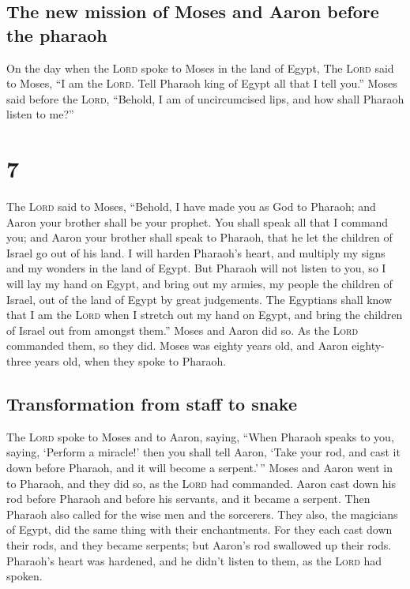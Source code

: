 \hypertarget{the-new-mission-of-moses-and-aaron-before-the-pharaoh}{%
\subsection{The new mission of Moses and Aaron before the
pharaoh}\label{the-new-mission-of-moses-and-aaron-before-the-pharaoh}}

 On the day when the \textsc{Lord} spoke to Moses in the
land of Egypt,  The \textsc{Lord} said to Moses, ``I am
the \textsc{Lord}. Tell Pharaoh king of Egypt all that I tell you.''
 Moses said before the \textsc{Lord}, ``Behold, I am of
uncircumcised lips, and how shall Pharaoh listen to me?''

\hypertarget{section-6}{%
\section{7}\label{section-6}}

 The \textsc{Lord} said to Moses, ``Behold, I have made
you as God to Pharaoh; and Aaron your brother shall be your prophet.
 You shall speak all that I command you; and Aaron your
brother shall speak to Pharaoh, that he let the children of Israel go
out of his land.  I will harden Pharaoh's heart, and
multiply my signs and my wonders in the land of Egypt. 
But Pharaoh will not listen to you, so I will lay my hand on Egypt, and
bring out my armies, my people the children of Israel, out of the land
of Egypt by great judgements.  The Egyptians shall know
that I am the \textsc{Lord} when I stretch out my hand on Egypt, and
bring the children of Israel out from amongst them.'' 
Moses and Aaron did so. As the \textsc{Lord} commanded them, so they
did.  Moses was eighty years old, and Aaron eighty-three
years old, when they spoke to Pharaoh.

\hypertarget{transformation-from-staff-to-snake}{%
\subsection{Transformation from staff to
snake}\label{transformation-from-staff-to-snake}}

 The \textsc{Lord} spoke to Moses and to Aaron, saying,
 ``When Pharaoh speaks to you, saying, `Perform a
miracle!' then you shall tell Aaron, `Take your rod, and cast it down
before Pharaoh, and it will become a serpent.'\,''  Moses
and Aaron went in to Pharaoh, and they did so, as the \textsc{Lord} had
commanded. Aaron cast down his rod before Pharaoh and before his
servants, and it became a serpent.  Then Pharaoh also
called for the wise men and the sorcerers. They also, the magicians of
Egypt, did the same thing with their enchantments.  For
they each cast down their rods, and they became serpents; but Aaron's
rod swallowed up their rods.  Pharaoh's heart was
hardened, and he didn't listen to them, as the \textsc{Lord} had spoken.


